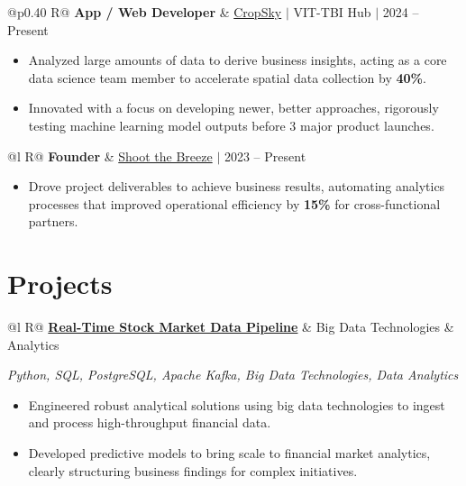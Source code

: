 \documentclass[a4paper,10pt]{article}
\newcommand{\ulink}[2]{\href{#1}{#2}}
\newcommand{\subheading}[1]{{\color[HTML]{0A0A0A}\fontsize{12}{14}\selectfont\bfseries #1}}
\newcommand{\techstack}[1]{{\color[HTML]{5C5C5C}\fontsize{10.5}{12.5}\selectfont\itshape #1}}
\newcommand{\meta}[1]{{\color[HTML]{5C5C5C}\fontsize{10.5}{12.5}\selectfont #1}}
\begin{document}
\begin{tabularx}{\linewidth}{@{}p{0.40\linewidth} R@{}}
\subheading{App / Web Developer} & \meta{\ulink{https://sites.google.com/view/cropsky/home}{CropSky} $|$ VIT-TBI Hub $|$ 2024 -- Present}
\end{tabularx}
\begin{itemize}[nosep, leftmargin=1.5em, itemsep=2pt, topsep=2pt]
  \item {\color[HTML]{0A0A0A}\fontsize{11}{14}\selectfont Analyzed large amounts of data to derive business insights, acting as a core data science team member to accelerate spatial data collection by \textbf{40\%}.}
  \item {\color[HTML]{0A0A0A}\fontsize{11}{14}\selectfont Innovated with a focus on developing newer, better approaches, rigorously testing machine learning model outputs before 3 major product launches.}
\end{itemize}

\begin{tabularx}{\linewidth}{@{}l R@{}}
\subheading{Founder} & \meta{\ulink{https://shoot-the-breeze.vercel.app}{Shoot the Breeze} $|$ 2023 -- Present}
\end{tabularx}
\begin{itemize}[nosep, leftmargin=1.5em, itemsep=2pt, topsep=2pt]
  \item {\color[HTML]{0A0A0A}\fontsize{11}{14}\selectfont Drove project deliverables to achieve business results, automating analytics processes that improved operational efficiency by \textbf{15\%} for cross-functional partners.}
\end{itemize}

\section{Projects}
\vspace{2pt}

\begin{tabularx}{\linewidth}{@{}l R@{}}
\subheading{\ulink{https://github.com/su-jin1425/Real-Time-Stock-Market-Data-Pipeline}{Real-Time Stock Market Data Pipeline}} & \meta{Big Data Technologies \& Analytics}
\end{tabularx}
\techstack{Python, SQL, PostgreSQL, Apache Kafka, Big Data Technologies, Data Analytics}
\begin{itemize}[nosep, leftmargin=1.5em, itemsep=2pt, topsep=2pt]
  \item {\color[HTML]{0A0A0A}\fontsize{11}{14}\selectfont Engineered robust analytical solutions using big data technologies to ingest and process high-throughput financial data.}
  \item {\color[HTML]{0A0A0A}\fontsize{11}{14}\selectfont Developed predictive models to bring scale to financial market analytics, clearly structuring business findings for complex initiatives.}
\end{itemize}
\end{document}
